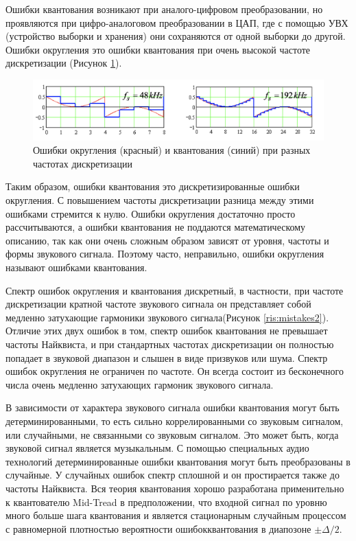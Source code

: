 \documentclass[12pt,a4paper,oneside]{report}
\begin{document}
Ошибки квантования возникают при аналого-цифровом преобразовании, но проявляются при цифро-аналоговом преобразовании в ЦАП, где с помощью УВХ (устройство выборки и хранения) они сохраняются от одной выборки до другой\cite{thirty}. Ошибки округления это ошибки квантования при очень высокой частоте дискретизации (Рисунок \ref{ris:mistakes}).

\begin{figure}[!htbp]
	\centering
	\includegraphics[scale=0.6]{mistakes.png}
	\caption{Ошибки округления (красный) и квантования (синий) при разных частотах дискретизации}
	\label{ris:mistakes}
\end{figure}

Таким образом, ошибки квантования это дискретизированные ошибки округления. С повышением частоты дискретизации разница между этими ошибками стремится к нулю. Ошибки округления достаточно просто рассчитываются, а ошибки квантования не поддаются математическому описанию, так как они очень сложным образом зависят от уровня, частоты и формы звукового сигнала. Поэтому часто, неправильно, ошибки округления называют ошибками квантования.

Спектр ошибок округления и квантования дискретный, в частности, при частоте дискретизации кратной частоте звукового сигнала он представляет собой медленно затухающие гармоники звукового сигнала(Рисунок \ref{ris:mistakes2}). Отличие этих двух ошибок в том, спектр ошибок квантования не превышает частоты Найквиста, и при стандартных частотах дискретизации он полностью попадает в звуковой диапазон и слышен в виде призвуков или шума. Спектр ошибок округления не ограничен по частоте. Он всегда состоит из бесконечного числа очень медленно затухающих гармоник звукового сигнала.

В зависимости от характера звукового сигнала ошибки квантования могут быть детерминированными, то есть сильно коррелированными со звуковым сигналом, или случайными, не связанными со звуковым сигналом. Это может быть, когда звуковой сигнал является музыкальным. С помощью специальных аудио технологий детерминированные ошибки квантования могут быть преобразованы в случайные. У случайных ошибок спектр сплошной и он простирается также до частоты Найквиста.
Вся теория квантования хорошо разработана применительно к квантователю Mid-Tread в предположении, что входной сигнал по уровню много больше шага квантования и является стационарным случайным процессом с равномерной плотностью вероятности ошибокквантования в диапозоне $\pm\Delta/2$.
\end{document}
